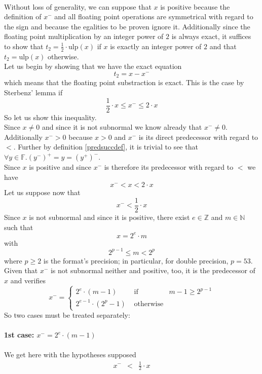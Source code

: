 \documentclass[a4paper,10pt,twoside]{article}
\newenvironment{proof}[1][Proof]{\begin{trivlist}
\item[\hskip \labelsep {\bfseries #1}]}{\end{trivlist}}
\newcommand{\N}{\ensuremath{\mathbb {N}}}
\newcommand{\Z}{\ensuremath{\mathbb {Z}}}
\newcommand{\F}{\ensuremath{\mathbb {F}}}
\newcommand{\mUlp}{\ensuremath{\mathrm{ulp}}}
\begin{document}
\begin{proof} ~\\
Without loss of generality, we can suppose that $x$ is positive because the definition of $x^-$ and all floating
point operations are symmetrical with regard to the sign \cite{IEEE754} and because the egalities to be proven ignore it.
Additionally since the floating point multiplication by an integer power of $2$ is always exact, it suffices to
show that $t_2 = \frac{1}{2} \cdot \mUlp \left( x \right)$ if $x$ is exactly an integer power of $2$ and that
$t_2 = \mUlp\left( x \right)$ otherwise.\\
Let us begin by showing that we have the exact equation
$$t_2 = x - x^-$$
which means that the floating point substraction is exact. This is the case by Sterbenz' lemma \cite{Ste74} if
$$\frac{1}{2} \cdot x \leq x^- \leq 2 \cdot x$$
So let us show this inequality. \\
Since $x \not = 0$ and since it is not subnormal we know already that $x^- \not = 0$.
Additionally $x^- > 0$ because $x > 0$ and $x^-$ is its direct predecessor with regard to $<$.
Further by definition \ref{predsuccdef}, it is trivial to see that
$\forall y \in \F.\left( y^- \right)^+ = y = \left( y^+ \right)^-$.\\
Since $x$ is positive and since $x^-$ is therefore its predecessor with regard to $<$ we have
$$x^- < x < 2 \cdot x$$
Let us suppose now that
$$x^- < \frac{1}{2} \cdot x$$
Since $x$ is not subnormal and since it is positive, there exist $e \in \Z$ and  $m \in \N$ such that
$$x = 2^e \cdot m$$
with
$$2^{p-1} \leq m < 2^p$$
where $p \geq 2$ is the format's precision; in particular, for double precision, $p=53$.\\
Given that $x^-$ is not subnormal neither and positive, too, it is the predecessor of $x$ and verifies
$$x^- = \left \lbrace \begin{array}{lll} 2^e \cdot \left(m - 1 \right) & \mbox{ if } & m-1 \geq 2^{p-1} \\
                                             2^{e-1} \cdot \left( 2^p - 1 \right) & \mbox{ otherwise} & \end{array} \right.$$
So two cases must be treated separately:\\~\\
{\bf 1st case: $x^- = 2^e \cdot  \left( m -1 \right)$ } \\ ~ \\
We get here with the hypotheses supposed
\begin{eqnarray*}
x^- & < & \frac{1}{2} \cdot x \\

\end{eqnarray*}
\end{proof}
\end{document}
